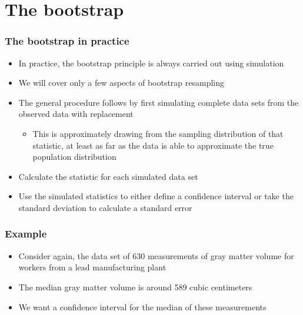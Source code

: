 \documentclass[aspectratio=169]{beamer}
\begin{document}
\section{The bootstrap}
\begin{frame}\frametitle{The bootstrap in practice}
\begin{itemize}
\item In practice, the bootstrap principle is always carried out
  using simulation
\item We will cover only a few aspects of bootstrap resampling
\item The general procedure follows by first simulating complete data sets
  from the observed data with replacement
  \begin{itemize}
  \item This is approximately drawing from the sampling distribution
    of that statistic, at least as far as the data is able to
    approximate the true population distribution
  \end{itemize}
\item Calculate the statistic for each simulated data set
\item Use the simulated statistics to either define a confidence interval
  or take the standard deviation to calculate a standard error
\end{itemize}
\end{frame}

\begin{frame}\frametitle{Example}
\begin{itemize}
\item Consider again, the data set of $630$ measurements of gray matter volume
  for workers from a lead manufacturing plant
\item The median gray matter volume is around 589 cubic centimeters
\item We want a confidence interval for the median of these
  measurements
\end{itemize}
\end{frame}
\end{document}
